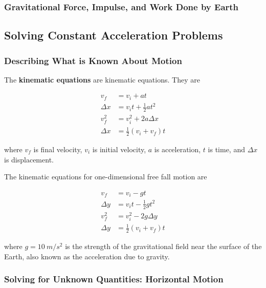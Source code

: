 \documentclass[dvipsnames]{article}
\begin{document}

\subsubsection{Gravitational Force, Impulse, and Work Done by Earth}



\subsection{Solving Constant Acceleration Problems}

\subsubsection{Describing What is Known About Motion}

The \textbf{\gls{kinematic equations}} are \glsdesc{kinematic equations}. They are

\begin{align}
    v_f &= v_i + at \\[1ex]
    \Delta x &= v_i t + \frac{1}{2}at^2 \\[1ex]
    v_f^2 &= v_i^2 + 2 a \Delta x \\[1ex]
    \Delta x &= \frac{1}{2} \left(v_i + v_f\right) t
\end{align}

where $v_f$ is final velocity, $v_i$ is initial velocity, $a$ is acceleration, $t$ is time, and $\Delta x$ is displacement. 

The kinematic equations for one-dimensional free fall motion are

\begin{align}
    v_f &= v_i - gt \label{xgXRE} \\[1ex]
    \Delta y &= v_i t - \frac{1}{2}gt^2 \\[1ex]
    v_f^2 &= v_i^2 - 2g\Delta y \\[1ex]
    \Delta y &= \frac{1}{2}\left(v_i + v_f\right) t
\end{align}

where $g = \SI{10}{m/s^2}$ is the strength of the gravitational field near the surface of the Earth, also known as the acceleration due to gravity.

\subsubsection{Solving for Unknown Quantities: Horizontal Motion}
\end{document}
